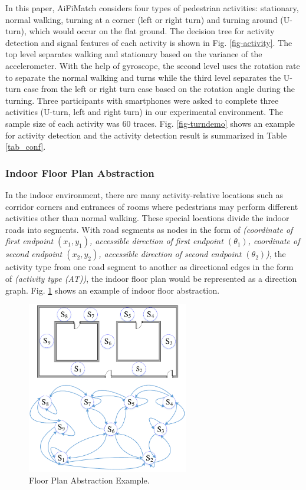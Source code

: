 \documentclass[conference]{IEEEtran}
\begin{document}
In this paper, AiFiMatch considers four types of pedestrian activities: stationary, normal walking, turning at a corner (left or right turn) and turning around (U-turn), which would occur on the flat ground. The decision tree for activity detection and signal features of each activity is shown in Fig. \ref{fig-activity}. The top level separates walking and stationary based on the variance of the accelerometer. With the help of gyroscope, the second level uses the rotation rate to separate the normal walking and turns while the third level separates the U-turn case from the left or right turn case based on the rotation angle during the turning. Three participants with smartphones were asked to complete three activities (U-turn, left and right turn) in our experimental environment. The sample size of each activity was $60$ traces. Fig. \ref{fig-turndemo} shows an example for activity detection and the activity detection result is summarized in Table \ref{tab_conf}.

\subsubsection{Indoor Floor Plan Abstraction}

In the indoor environment, there are many activity-relative locations such as corridor corners and entrances of rooms where pedestrians may perform different activities other than normal walking. These special locations divide the indoor roads into segments. With road segments as nodes in the form of \emph{(coordinate of first endpoint $(x_1,y_1)$, accessible direction of first endpoint $({\theta}_1)$, coordinate of second endpoint $(x_2,y_2)$, accessible direction of second endpoint $({\theta}_2)$)}, the activity type from one road segment to another as directional edges in the form of \emph{(activity type (AT))}, the indoor floor plan would be represented as a direction graph. Fig. \ref{fig-abstract} shows an example of indoor floor abstraction. 

\begin{figure}[!htbp]
	\centering
	\includegraphics[width=2.776in]{AiFiMatch-MapAbstract}
	\caption{Floor Plan Abstraction Example.}
	\label{fig-abstract}
\end{figure}
\end{document}
